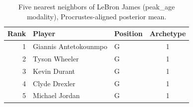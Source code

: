\begin{table}[htbp]
  \centering\small
  \begin{tabular}{rllc}
    \toprule
    Rank & Player & Position & Archetype \\
    \midrule
    1 & Giannis Antetokounmpo & G & 1 \\
    2 & Tyson Wheeler & G & 1 \\
    3 & Kevin Durant & G & 1 \\
    4 & Clyde Drexler & G & 1 \\
    5 & Michael Jordan & G & 1 \\
    \bottomrule
  \end{tabular}
  \caption{Five nearest neighbors of LeBron James (peak_age modality), Procrustes-aligned posterior mean.}
  \label{tab:LeBron_James_neighbors_peak_age}
\end{table}

